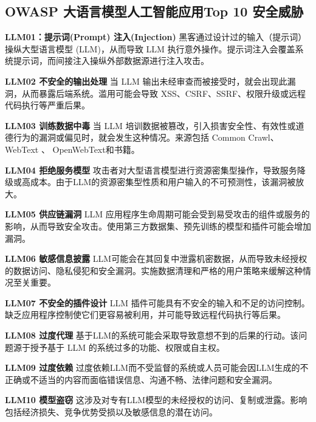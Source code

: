 \documentclass[
]{article}
\begin{document}
\subsection{OWASP 大语言模型人工智能应用Top 10
安全威胁}\label{owasp-ux5927ux8bedux8a00ux6a21ux578bux4ebaux5de5ux667aux80fdux5e94ux7528top-10-ux5b89ux5168ux5a01ux80c1}

\textbf{LLM01：提示词(Prompt) 注入(Injection)}
黑客通过设计过的输入（提示词）操纵大型语言模型 (LLM)，从而导致 LLM
执行意外操作。提示词注入会覆盖系统提示词，而间接注入操纵外部数据源进行注入攻击。

\textbf{LLM02 不安全的输出处理} 当 LLM
输出未经审查而被接受时，就会出现此漏洞，从而暴露后端系统。滥用可能会导致
XSS、CSRF、SSRF、权限升级或远程代码执行等严重后果。

\textbf{LLM03 训练数据中毒} 当 LLM
培训数据被篡改，引入损害安全性、有效性或道德行为的漏洞或偏见时，就会发生这种情况。来源包括
Common Crawl、 WebText 、 OpenWebText和书籍。

\textbf{LLM04 拒绝服务模型}
攻击者对大型语言模型进行资源密集型操作，导致服务降级或高成本。由于LLM的资源密集型性质和用户输入的不可预测性，该漏洞被放大。

\textbf{LLM05 供应链漏洞} LLM
应用程序生命周期可能会受到易受攻击的组件或服务的影响，从而导致安全攻击。使用第三方数据集、预先训练的模型和插件可能会增加漏洞。

\textbf{LLM06 敏感信息披露}
LLM可能会在其回复中泄露机密数据，从而导致未经授权的数据访问、隐私侵犯和安全漏洞。实施数据清理和严格的用户策略来缓解这种情况至关重要。

\textbf{LLM07 不安全的插件设计} LLM
插件可能具有不安全的输入和不足的访问控制。缺乏应用程序控制使它们更容易被利用，并可能导致远程代码执行等后果。

\textbf{LLM08 过度代理}
基于LLM的系统可能会采取导致意想不到的后果的行动。该问题源于授予基于 LLM
的系统过多的功能、权限或自主权。

\textbf{LLM09 过度依赖}
过度依赖LLM而不受监督的系统或人员可能会因LLM生成的不正确或不适当的内容而面临错误信息、沟通不畅、法律问题和安全漏洞。

\textbf{LLM10 模型盗窃}
这涉及对专有LLM模型的未经授权的访问、复制或泄露。影响包括经济损失、竞争优势受损以及敏感信息的潜在访问。
\end{document}
